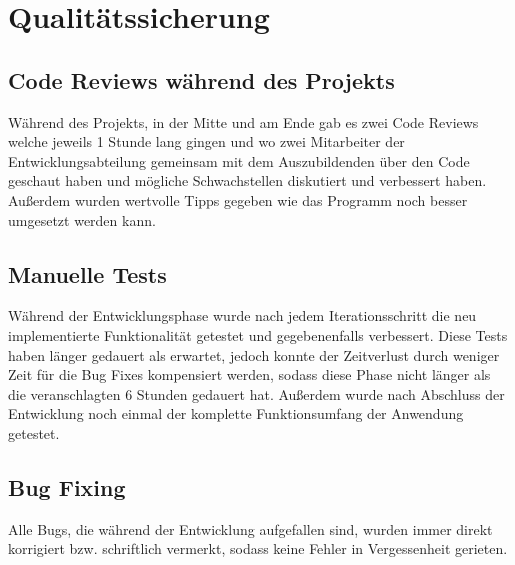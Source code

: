 \section{Qualitätssicherung} 
\label{sec:Qualitätssicherung}

\subsection{Code Reviews während des Projekts}
\label{sec:Code Reviews während des Projekts}
Während des Projekts, in der Mitte und am Ende gab es zwei Code Reviews welche jeweils 1 Stunde lang gingen und wo zwei Mitarbeiter der Entwicklungsabteilung gemeinsam mit dem Auszubildenden über den Code geschaut haben und mögliche Schwachstellen diskutiert und verbessert haben. Außerdem wurden wertvolle Tipps gegeben wie das Programm noch besser umgesetzt werden kann.    

\subsection{Manuelle Tests}
\label{sec:Manuelle Tests}
Während der Entwicklungsphase wurde nach jedem Iterationsschritt die neu implementierte Funktionalität getestet und gegebenenfalls verbessert. Diese Tests haben länger gedauert als erwartet, jedoch konnte der Zeitverlust durch weniger Zeit für die Bug Fixes kompensiert werden, sodass diese Phase nicht länger als die veranschlagten 6 Stunden gedauert hat. Außerdem wurde nach Abschluss der Entwicklung noch einmal der komplette Funktionsumfang der Anwendung getestet. 

\subsection{Bug Fixing}
\label{sec:Bug Fixing}
Alle Bugs, die während der Entwicklung aufgefallen sind, wurden immer direkt korrigiert bzw. schriftlich vermerkt, sodass keine Fehler in Vergessenheit gerieten.